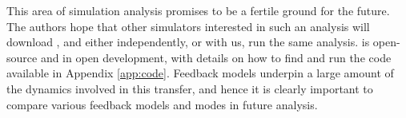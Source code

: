 This area of simulation analysis promises to be a fertile ground for the
future. The authors hope that other simulators interested in such an analysis
will download \ltcaesar{}, and either independently, or with us, run the same
analysis. \ltcaesar{} is open-source and in open development, with details on
how to find and run the code available in Appendix \ref{app:code}. Feedback
models underpin a large amount of the dynamics involved in this transfer, and
hence it is clearly important to compare various feedback models and modes in
future analysis.

